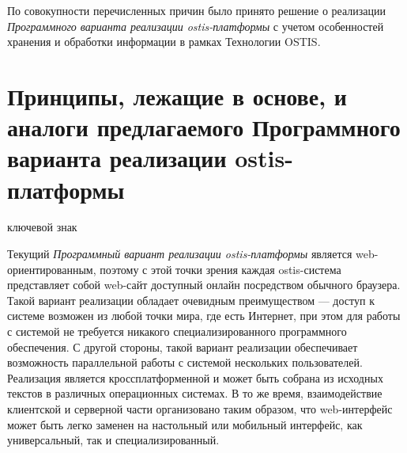 По совокупности перечисленных причин было принято решение о реализации \textit{Программного варианта реализации ostis-платформы}  с учетом особенностей хранения и обработки информации в рамках Технологии OSTIS.

\section{Принципы, лежащие в основе, и аналоги предлагаемого Программного варианта реализации ostis-платформы}
\label{sec_soft_platform_description}

\begin{SCn}

\begin{scnrelfromlist}{ключевой знак}
\end{scnrelfromlist}

\end{SCn}

\bigskip

Текущий \textit{Программный вариант реализации ostis-платформы} является web-ориентированным, поэтому с этой точки зрения каждая \mbox{ostis-система} представляет собой web-сайт доступный онлайн посредством обычного браузера. Такой вариант реализации обладает очевидным преимуществом --- доступ к системе возможен из любой точки мира, где есть Интернет, при этом для работы с системой не требуется никакого специализированного программного обеспечения. С другой стороны, такой вариант реализации обеспечивает возможность параллельной работы с системой нескольких пользователей. Реализация является кроссплатформенной и может быть собрана из исходных текстов в различных операционных системах. В то же время, взаимодействие клиентской и серверной части организовано таким образом, что \mbox{web-интерфейс} может быть легко заменен на настольный или мобильный интерфейс, как универсальный, так и специализированный.


